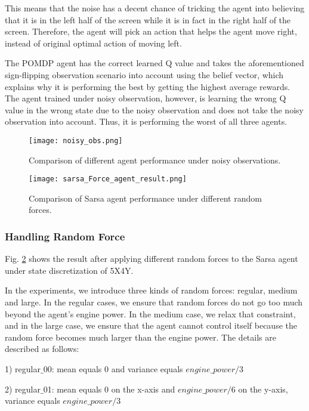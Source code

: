 \documentclass[10pt, conference]{IEEEtran}
\begin{document}
This means that the noise has a decent chance of tricking the agent into believing that it is in the left half of the screen while it is in fact in the right half of the screen. Therefore, the agent will pick an action that helps the agent move right, instead of original optimal action of moving left.

The POMDP agent has the correct learned Q value and takes the aforementioned sign-flipping observation scenario into account using the belief vector, which explains why it is performing the best by getting the highest average rewards. The agent trained under noisy observation, however, is learning the wrong Q value in the wrong state due to the noisy observation and does not take the noisy observation into account. Thus, it is performing the worst of all three agents.

\begin{figure}[!t]
    \centering
    \texttt{[image: noisy\_obs.png]}
    \caption{Comparison of different agent performance under noisy observations.}
    \label{fig:noisy_obs}
\end{figure}

\begin{figure}[!t]
    \centering
    \texttt{[image: sarsa\_Force\_agent\_result.png]}
    \caption{Comparison of Sarsa agent performance under different random forces.}
    \label{fig:Force_result}
\end{figure}

\subsubsection{Handling Random Force} \label{random_force}
Fig. \ref{fig:Force_result} shows the result after applying different random forces to the Sarsa agent under state discretization of 5X4Y. 

In the experiments, we introduce three kinds of random forces: regular, medium and large. In the regular cases, we ensure that random forces do not go too much beyond the agent's engine power. In the medium case, we relax that constraint, and in the large case, we ensure that the agent cannot control itself because the random force becomes much larger than the engine power. The details are described as follows:

1) regular$\_$00: mean equals 0 and variance equals $engine\_power/3$

2) regular$\_$01: mean equals 0 on the x-axis and  $engine\_power/6$ on the y-axis, variance equals $engine\_power/3$ 
\end{document}
